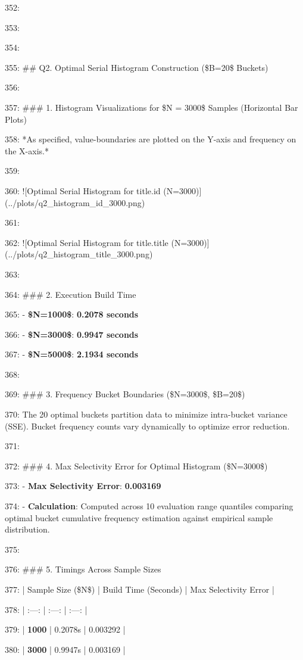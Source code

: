 \documentclass[11pt,a4paper]{article}
\begin{document}
{352:

353:

354:

355: \#\# Q2. Optimal Serial Histogram Construction (\$B=20\$ Buckets)

356:

357: \#\#\# 1. Histogram Visualizations for \$N = 3000\$ Samples (Horizontal Bar Plots)

358: *As specified, value-boundaries are plotted on the Y-axis and frequency on the X-axis.*

359:

360: ![Optimal Serial Histogram for title.id (N=3000)](../plots/q2\_histogram\_id\_3000.png)

361:

362: ![Optimal Serial Histogram for title.title (N=3000)](../plots/q2\_histogram\_title\_3000.png)

363:

364: \#\#\# 2. Execution Build Time

365: - \textbf{\$N=1000\$}: \textbf{0.2078 seconds}

366: - \textbf{\$N=3000\$}: \textbf{0.9947 seconds}

367: - \textbf{\$N=5000\$}: \textbf{2.1934 seconds}

368:

369: \#\#\# 3. Frequency Bucket Boundaries (\$N=3000\$, \$B=20\$)

370: The 20 optimal buckets partition data to minimize intra-bucket variance (SSE). Bucket frequency counts vary dynamically to optimize error reduction.

371:

372: \#\#\# 4. Max Selectivity Error for Optimal Histogram (\$N=3000\$)

373: - \textbf{Max Selectivity Error}: \textbf{0.003169}

374: - \textbf{Calculation}: Computed across 10 evaluation range quantiles comparing optimal bucket cumulative frequency estimation against empirical sample distribution.

375:

376: \#\#\# 5. Timings Across Sample Sizes

377: | Sample Size (\$N\$) | Build Time (Seconds) | Max Selectivity Error |

378: | :---: | :---: | :---: |

379: | \textbf{1000} | 0.2078s | 0.003292 |

380: | \textbf{3000} | 0.9947s | 0.003169 |

}
\end{document}
